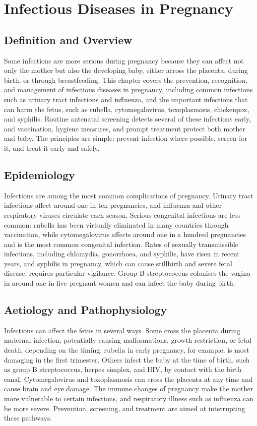 \chapter{Infectious Diseases in Pregnancy}

\section*{Definition and Overview}
Some infections are more serious during pregnancy because they can affect not only the mother but also the developing baby, either across the placenta, during birth, or through breastfeeding. This chapter covers the prevention, recognition, and management of infectious diseases in pregnancy, including common infections such as urinary tract infections and influenza, and the important infections that can harm the fetus, such as rubella, cytomegalovirus, toxoplasmosis, chickenpox, and syphilis. Routine antenatal screening detects several of these infections early, and vaccination, hygiene measures, and prompt treatment protect both mother and baby. The principles are simple: prevent infection where possible, screen for it, and treat it early and safely.

\section*{Epidemiology}
Infections are among the most common complications of pregnancy. Urinary tract infections affect around one in ten pregnancies, and influenza and other respiratory viruses circulate each season. Serious congenital infections are less common: rubella has been virtually eliminated in many countries through vaccination, while cytomegalovirus affects around one in a hundred pregnancies and is the most common congenital infection. Rates of sexually transmissible infections, including chlamydia, gonorrhoea, and syphilis, have risen in recent years, and syphilis in pregnancy, which can cause stillbirth and severe fetal disease, requires particular vigilance. Group B streptococcus colonises the vagina in around one in five pregnant women and can infect the baby during birth.

\section*{Aetiology and Pathophysiology}
Infections can affect the fetus in several ways. Some cross the placenta during maternal infection, potentially causing malformations, growth restriction, or fetal death, depending on the timing: rubella in early pregnancy, for example, is most damaging in the first trimester. Others infect the baby at the time of birth, such as group B streptococcus, herpes simplex, and HIV, by contact with the birth canal. Cytomegalovirus and toxoplasmosis can cross the placenta at any time and cause brain and eye damage. The immune changes of pregnancy make the mother more vulnerable to certain infections, and respiratory illness such as influenza can be more severe. Prevention, screening, and treatment are aimed at interrupting these pathways.

